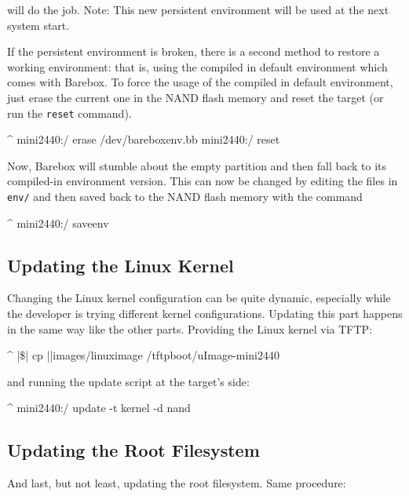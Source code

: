 will do the job. Note: This new persistent environment will be used at the next
system start.

If the persistent environment is broken, there is a second method to restore a
working environment: that is, using the compiled in default environment which
comes with Barebox.
To force the usage of the compiled in default environment, just erase the
current one in the NAND flash memory and reset the target (or run the
\texttt{reset} command).

\begin{ptxshell}[escapechar=|]{^}
mini2440:/ erase /dev/bareboxenv.bb
mini2440:/ reset
\end{ptxshell}

Now, Barebox will stumble about the empty partition and then fall back to its
compiled-in environment version. This can now be changed by editing the files
in \texttt{env/} and then saved back to the NAND flash memory with the command

\begin{ptxshell}[escapechar=|]{^}
mini2440:/ saveenv
\end{ptxshell}

\subsection{Updating the Linux Kernel}

Changing the Linux kernel configuration can be quite dynamic, especially while
the developer is trying different kernel configurations. Updating this part
happens in the same way like the other parts. Providing the Linux kernel via
TFTP:

\begin{ptxshell}[escapechar=|]{^}
|\$| cp |\ptxdistPlatformDir |images/linuximage /tftpboot/uImage-mini2440
\end{ptxshell}

and running the update script at the target's side:

\begin{ptxshell}[escapechar=|]{^}
mini2440:/ update -t kernel -d nand
\end{ptxshell}

\subsection{Updating the Root Filesystem}

And last, but not least, updating the root filesystem. Same procedure:

